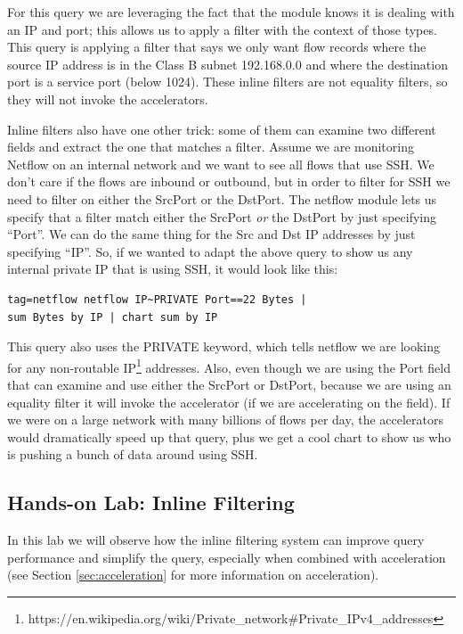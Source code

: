 For this query we are leveraging the fact that the  module
knows it is dealing with an IP and port; this allows us to apply a
filter with the context of those types. This query is applying a filter
that says we only want flow records where the source IP address is in
the Class B subnet 192.168.0.0 and where the destination port is a
service port (below 1024). These inline filters are not equality
filters, so they will not invoke the accelerators.

Inline filters also have one other trick: some of them can examine two
different fields and extract the one that matches a filter. Assume we
are monitoring Netflow on an internal network and we want to see all
flows that use SSH. We don't care if the flows are inbound or outbound,
but in order to filter for SSH we need to filter on either the SrcPort
or the DstPort. The netflow module lets us specify that a filter match
either the SrcPort \emph{or} the DstPort by just specifying ``Port''. We can do the
same thing for the Src and Dst IP addresses by just specifying ``IP''. So, if we wanted to adapt
the above query to show us any internal private IP that is using
SSH, it would look like this:

\begin{Verbatim}[breaklines=true]
tag=netflow netflow IP~PRIVATE Port==22 Bytes |
sum Bytes by IP | chart sum by IP
\end{Verbatim}

This query also uses the PRIVATE keyword, which tells netflow we are
looking for any non-routable
IP\footnote{https://en.wikipedia.org/wiki/Private\_network\#Private\_IPv4\_addresses} addresses.
Also, even though we are using the Port field that can examine and use
either the SrcPort or DstPort, because we are using an equality filter
it will invoke the accelerator (if we are accelerating on the field).
If we were on a large network with many billions of flows per day, the
accelerators would dramatically speed up that query, plus we get a cool
chart to show us who is pushing a bunch of data around using SSH.

\subsection{Hands-on Lab: Inline Filtering}

In this lab we will observe how the inline
filtering system can improve query performance and simplify the query,
especially when combined with acceleration (see Section \ref{sec:acceleration} for more information
on acceleration).

